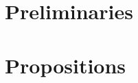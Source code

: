\documentclass[11pt,reqno]{amsart}
\theoremstyle{definition}
\theoremstyle{plain}
\begin{document}
\section{Preliminaries}

\section{Propositions}






\end{document}
